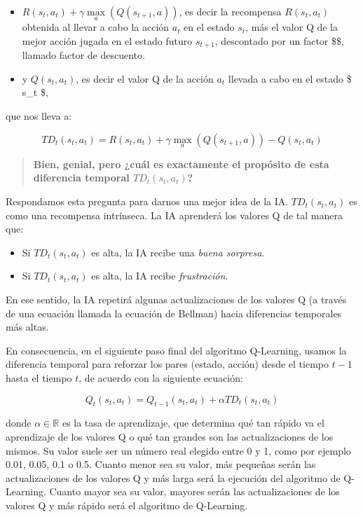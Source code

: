 \documentclass[
]{book}
\providecommand{\tightlist}{%
  \setlength{\itemsep}{0pt}\setlength{\parskip}{0pt}}
\begin{document}
\begin{itemize}
\item
  \(R(s_t,a_t) + \gamma \underset{a}{\max}(Q(s_{t+1},a))\), es decir la recompensa \(R (s_t, a_t)\) obtenida al llevar a cabo la acción \(a_t\) en el estado \(s_t\), más el valor Q de la mejor acción jugada en el estado futuro \(s_{t + 1}\), descontado por un factor \$\gamma \in [0,1] \$, llamado factor de descuento.
\item
  y \(Q(s_t, a_t)\), es decir el valor Q de la acción \(a_t\) llevada a cabo en el estado \$ s\_t \$,
\end{itemize}

que nos lleva a:

\[TD_t(s_t,a_t) = R(s_t,a_t) + \gamma \underset{a}{\max}(Q(s_{t+1},a)) - Q(s_t,a_t)\]

\begin{quote}
\textbf{Bien, genial, pero ¿cuál es exactamente el propósito de esta diferencia temporal \(TD_t(s_t,a_t)\)?}
\end{quote}

Respondamos esta pregunta para darnos una mejor idea de la IA. \(TD_t (s_t, a_t)\) es como una recompensa intrínseca. La IA aprenderá los valores Q de tal manera que:

\begin{itemize}
\tightlist
\item
  Si \(TD_t(s_t,a_t)\) es alta, la IA recibe una \emph{buena sorpresa}.
\item
  Si \(TD_t(s_t,a_t)\) es alta, la IA recibe \emph{frustración}.
\end{itemize}

En ese sentido, la IA repetirá algunas actualizaciones de los valores Q (a través de una ecuación llamada la ecuación de Bellman) hacia diferencias temporales más altas.

En consecuencia, en el siguiente paso final del algoritmo Q-Learning, usamos la diferencia temporal para reforzar los pares (estado, acción) desde el tiempo \(t-1\) hasta el tiempo \(t\), de acuerdo con la siguiente ecuación:

\[Q_t(s_t,a_t) = Q_{t-1}(s_t,a_t) + \alpha TD_t(s_t,a_t)\]

donde \(\alpha \in \mathbb{R}\) es la tasa de aprendizaje, que determina qué tan rápido va el aprendizaje de los valores Q o qué tan grandes son las actualizaciones de los mismos. Su valor suele ser un número real elegido entre 0 y 1, como por ejemplo 0.01, 0.05, 0.1 o 0.5. Cuanto menor sea su valor, más pequeñas serán las actualizaciones de los valores Q y más larga será la ejecución del algoritmo de Q-Learning. Cuanto mayor sea su valor, mayores serán las actualizaciones de los valores Q y más rápido será el algoritmo de Q-Learning.
\end{document}
